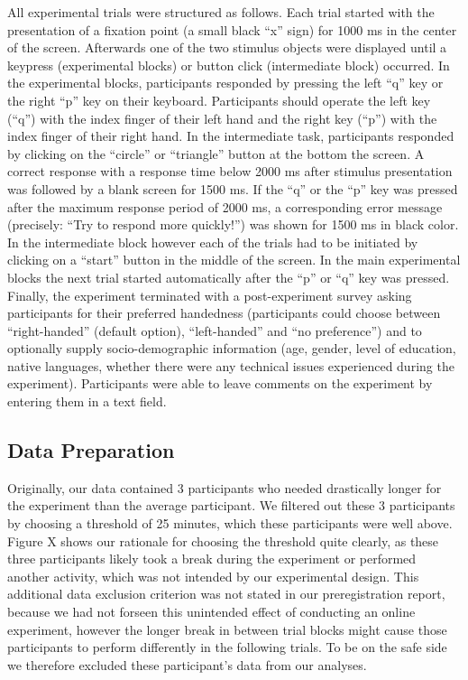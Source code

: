 \documentclass[
  english,
  man,floatsintext]{apa6}
\begin{document}
All experimental trials were structured as follows. Each trial started with the presentation of a fixation point (a small black \enquote{x} sign) for 1000 ms in the center of the screen. Afterwards one of the two stimulus objects were displayed until a keypress (experimental blocks) or button click (intermediate block) occurred. In the experimental blocks, participants responded by pressing the left \enquote{q} key or the right \enquote{p} key on their keyboard. Participants should operate the left key (\enquote{q}) with the index finger of their left hand and the right key (\enquote{p}) with the index finger of their right hand. In the intermediate task, participants responded by clicking on the \enquote{circle} or \enquote{triangle} button at the bottom the screen. A correct response with a response time below 2000 ms after stimulus presentation was followed by a blank screen for 1500 ms. If the \enquote{q} or the \enquote{p} key was pressed after the maximum response period of 2000 ms, a corresponding error message (precisely: \enquote{Try to respond more quickly!}) was shown for 1500 ms in black color. In the intermediate block however each of the trials had to be initiated by clicking on a \enquote{start} button in the middle of the screen. In the main experimental blocks the next trial started automatically after the \enquote{p} or \enquote{q} key was pressed. Finally, the experiment terminated with a post-experiment survey asking participants for their preferred handedness (participants could choose between \enquote{right-handed} (default option), \enquote{left-handed} and \enquote{no preference}) and to optionally supply socio-demographic information (age, gender, level of education, native languages, whether there were any technical issues experienced during the experiment). Participants were able to leave comments on the experiment by entering them in a text field.

\hypertarget{data-preparation}{%
\subsection{Data Preparation}\label{data-preparation}}

Originally, our data contained 3 participants who needed drastically longer for the experiment than the average participant. We filtered out these 3 participants by choosing a threshold of 25 minutes, which these participants were well above. Figure X shows our rationale for choosing the threshold quite clearly, as these three participants likely took a break during the experiment or performed another activity, which was not intended by our experimental design. This additional data exclusion criterion was not stated in our preregistration report, because we had not forseen this unintended effect of conducting an online experiment, however the longer break in between trial blocks might cause those participants to perform differently in the following trials. To be on the safe side we therefore excluded these participant's data from our analyses.
\end{document}
